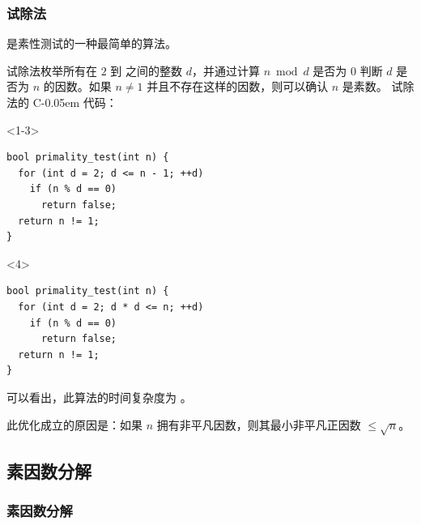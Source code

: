\documentclass{../pkslide}
\newcommand{\Cpp}{\texorpdfstring{C\kern-0.05em\protect\raisebox{.35ex}{\textsmaller[2]{+\kern-0.05em+}}}{C++}}
\begin{document}
\begin{frame}[fragile]
  \frametitle{试除法}
  
  是素性测试的一种最简单的算法。
  
  \emptyline
  
  \pause
  
  试除法枚举所有在 $2$ 到  之间的整数 $d$，并通过计算 $n \bmod d$ 是否为 $0$ 判断 $d$ 是否为 $n$ 的因数。如果 $n \ne 1$ 并且不存在这样的因数，则可以确认 $n$ 是素数。%
    \pause%
  试除法的 \Cpp{} 代码：
  
  \begin{onlyenv}<1-3>
\begin{verbatim}
bool primality_test(int n) {
  for (int d = 2; d <= n - 1; ++d)
    if (n % d == 0)
      return false;
  return n != 1;
}
\end{verbatim}
  \end{onlyenv}
  
  \begin{onlyenv}<4>
\begin{verbatim}
bool primality_test(int n) {
  for (int d = 2; d * d <= n; ++d)
    if (n % d == 0)
      return false;
  return n != 1;
}
\end{verbatim}
  \end{onlyenv}
  
  可以看出，此算法的时间复杂度为 。
  
  \pause
  此优化成立的原因是：如果 $n$ 拥有非平凡因数，则其最小非平凡正因数 $\le \sqrt{n}$。
\end{frame}


\subsection{素因数分解}
\subsubsection*{素因数分解}

\end{document}
